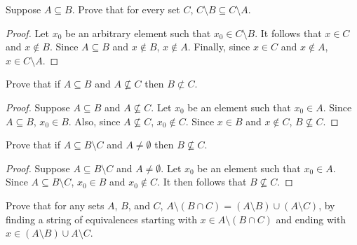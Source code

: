 \begin{tcolorbox}[title=Problem 3, breakable]
    Suppose $A \subseteq B$. Prove that for every set $C$, $C \setminus B \subseteq C \setminus A$.
\end{tcolorbox}

\begin{proof}
    Let $x_0$ be an arbitrary element such that $x_0 \in C \setminus B$.
    It follows that $x \in C$ and $x \not \in B$.
    Since $A \subseteq B$ and $x \not \in B$, $x \not \in A$.
    Finally, since $x \in C$ and $x \not \in A$, $x \in C \setminus A$.
\end{proof}

\begin{tcolorbox}[title=Problem 4, breakable]
    Prove that if $A \subseteq B$ and $A \not \subseteq C$ then $B \not \subset C$.
\end{tcolorbox}

\begin{proof}
    Suppose $A \subseteq B$ and $A \not \subseteq C$.
    Let $x_0$ be an element such that $x_0 \in A$.
    Since $A \subseteq B$, $x_0 \in B$.
    Also, since $A \not \subseteq C$, $x_0 \not \in C$.
    Since $x \in B$ and $x \not \in C$, $B \not \subseteq C$.
\end{proof}

\begin{tcolorbox}[title=Problem 5, breakable]
    Prove that if $A \subseteq B \setminus C$ and $A \not = \emptyset$ then $B \not \subseteq C$.
\end{tcolorbox}

\begin{proof}
    Suppose $A \subseteq B \setminus C$ and $A \not = \emptyset$.
    Let $x_0$ be an element such that $x_0 \in A$.
    Since $A \subseteq B \setminus C$, $x_0 \in B$ and $x_0 \not \in C$.
    It then follows that $B \not \subseteq C$.
\end{proof}

\begin{tcolorbox}[title=Problem 6, breakable]
    Prove that for any sets $A$, $B$, and $C$, $A \setminus (B \cap C) = (A \setminus B) \cup (A \setminus C)$,
    by finding a string of equivalences starting with $x \in A \setminus (B \cap C)$ and 
    ending with $x \in (A \setminus B) \cup A \setminus C$.
\end{tcolorbox}

